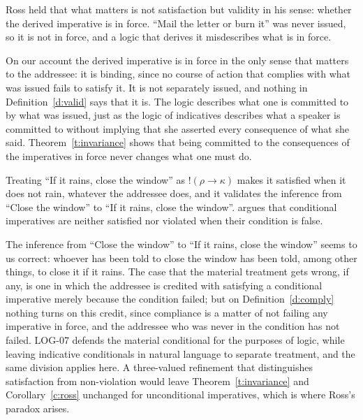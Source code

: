 \documentclass{situationist-preprint}
\begin{document}
\begin{objection}
Ross held that what matters is not satisfaction but validity in his sense: whether the derived imperative is in force. \enquote{Mail the letter or burn it} was never issued, so it is not in force, and a logic that derives it misdescribes what is in force.
\end{objection}

\begin{reply}
On our account the derived imperative is in force in the only sense that matters to the addressee: it is binding, since no course of action that complies with what was issued fails to satisfy it. It is not separately issued, and nothing in Definition~\ref{d:valid} says that it is. The logic describes what one is committed to by what was issued, just as the logic of indicatives describes what a speaker is committed to without implying that she asserted every consequence of what she said. Theorem~\ref{t:invariance} shows that being committed to the consequences of the imperatives in force never changes what one must do.
\end{reply}

\begin{objection}\label{o:conditional}
Treating \enquote{If it rains, close the window} as $!(\rho \rightarrow \kappa)$ makes it satisfied when it does not rain, whatever the addressee does, and it validates the inference from \enquote{Close the window} to \enquote{If it rains, close the window}. \citet{Vranas2008} argues that conditional imperatives are neither satisfied nor violated when their condition is false.
\end{objection}

\begin{reply}
The inference from \enquote{Close the window} to \enquote{If it rains, close the window} seems to us correct: whoever has been told to close the window has been told, among other things, to close it if it rains. The case that the material treatment gets wrong, if any, is one in which the addressee is credited with satisfying a conditional imperative merely because the condition failed; but on Definition~\ref{d:comply} nothing turns on this credit, since compliance is a matter of not failing any imperative in force, and the addressee who was never in the condition has not failed. LOG-07 defends the material conditional for the purposes of logic, while leaving indicative conditionals in natural language to separate treatment, and the same division applies here. A three-valued refinement that distinguishes satisfaction from non-violation would leave Theorem~\ref{t:invariance} and Corollary~\ref{c:ross} unchanged for unconditional imperatives, which is where Ross's paradox arises.
\end{reply}
\end{document}
